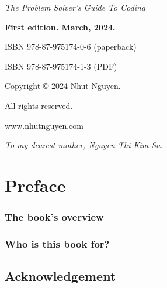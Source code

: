 

\usepackage[paperwidth=17cm,paperheight=22cm]{geometry}
\usepackage[paperwidth=7.5in,paperheight=9.25in]{geometry}


\date{March, 2024}
% 
\frontmatter


\textit{The Problem Solver's Guide To Coding} 

\textbf{First edition. March, 2024.} 

ISBN 978-87-975174-0-6 (paperback)

ISBN 978-87-975174-1-3 (PDF)


Copyright © 2024 Nhut Nguyen.

All rights reserved.

www.nhutnguyen.com

\newpage
\begin{center}
    \textit{To my dearest mother, Nguyen Thi Kim Sa.}
\end{center}

\sphinxstepscope



\chapter*{Preface}

\subsection*{The book’s overview}

\subsection*{Who is this book for?}

\section*{Acknowledgement}

\newpage




\mainmatter

